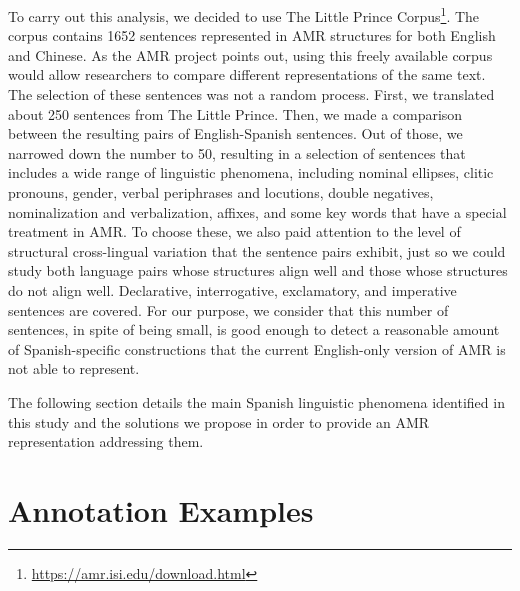 \documentclass[10pt, a4paper]{article}
\begin{document}
To carry out this analysis, we decided to use The Little Prince Corpus\footnote{\url{https://amr.isi.edu/download.html}}. The corpus contains 1652 sentences represented in AMR structures for both English and Chinese. As the AMR project points out, using this freely available corpus would allow researchers to compare different representations of the same text. The selection of these sentences was not a random process. First, we translated about 250 sentences from The Little Prince. Then, we made a comparison between the resulting pairs of English-Spanish sentences. Out of those, we narrowed down the number to 50, resulting in a selection of sentences that includes a wide range of linguistic phenomena, including nominal ellipses, clitic pronouns, gender, verbal periphrases and locutions, double negatives, nominalization and verbalization, affixes, and some key words that have a special treatment in AMR. To choose these, we also paid attention to the level of structural cross-lingual variation that the sentence pairs exhibit, just so we could study both language pairs whose structures align well and those whose structures do not align well. Declarative, interrogative, exclamatory, and imperative sentences are covered. For our purpose, we consider that this number of sentences, in spite of being small, is good enough to detect a reasonable amount of Spanish-specific constructions that the current English-only version of AMR is not able to represent.

The following section details the main Spanish linguistic phenomena identified in this study and the solutions we propose in order to provide an AMR representation addressing them.

\section{Annotation Examples}\label{sec:annotation-examples}
\end{document}
